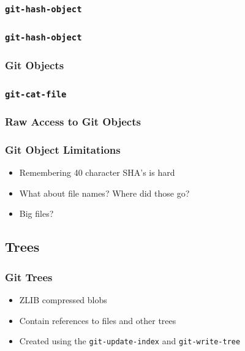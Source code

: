 \documentclass{beamer}
\begin{document}
\begin{frame}[fragile]
\frametitle{\texttt{git-hash-object}}

\end{frame}

\begin{frame}[fragile]
\frametitle{\texttt{git-hash-object}}

\end{frame}

\begin{frame}
\frametitle{Git Objects}
\begin{figure}
\end{figure}
\end{frame}


\begin{frame}[fragile]
\frametitle{\texttt{git-cat-file}}

\end{frame}

\begin{frame}[fragile]
\frametitle{Raw Access to Git Objects}

\end{frame}

\begin{frame}
\frametitle{Git Object Limitations}
\begin{itemize}
\item{Remembering 40 character SHA's is hard}
\item{What about file names? Where did those go?}
\item{Big files?}
\end{itemize}
\end{frame}

\subsection{Trees}

\begin{frame}
\frametitle{Git Trees}
\begin{itemize}
\item{ZLIB compressed blobs}
\item{Contain references to files and other trees}
\item{Created using the \texttt{git-update-index} and \texttt{git-write-tree}}
\end{itemize}
\end{frame}
\end{document}
